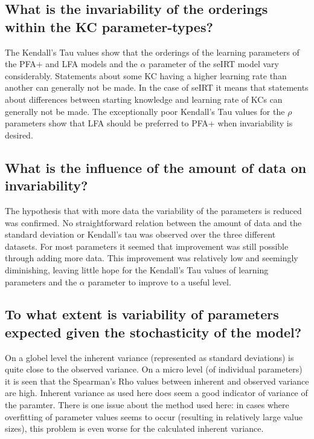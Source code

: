 \documentclass{scrartcl}
\begin{document}
\subsection{What is the invariability of the orderings within the KC parameter-types?}
The Kendall's Tau values show that the orderings of the learning parameters of the PFA+ and LFA models and the $\alpha$ parameter of the seIRT model vary considerably. Statements about some KC having a higher learning rate than another can generally not be made. In the case of seIRT it means that statements about differences between starting knowledge and learning rate of KCs can generally not be made. The exceptionally poor Kendall's Tau values for the $\rho$ parameters show that LFA should be preferred to PFA+ when invariability is desired.

\subsection{What is the influence of the amount of data on invariability?}
The hypothesis that with more data the variability of the parameters is reduced was confirmed. No straightforward relation between the amount of data and the standard deviation or Kendall's tau was observed over the three different datasets. For most parameters it seemed that improvement was still possible through adding more data. This improvement was relatively low and seemingly diminishing, leaving little hope for the Kendall's Tau values of learning parameters and the $\alpha$ parameter to improve to a useful level.

\subsection{To what extent is variability of parameters expected given the stochasticity of the model?}
On a globel level the inherent variance (represented as standard deviations) is quite close to the observed variance. On a micro level (of individual parameters) it is seen that the Spearman's Rho values between inherent and observed variance are high. Inherent variance as used here does seem a good indicator of variance of the paramter. There is one issue about the method used here: in cases where overfitting of parameter values seems to occur (resulting in relatively large value sizes), this problem is even worse for the calculated inherent variance.  
\end{document}
